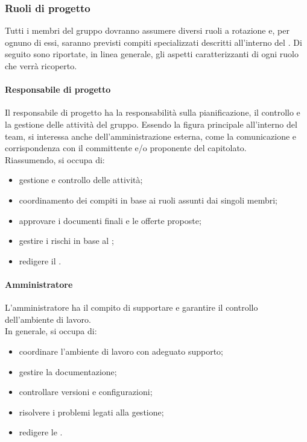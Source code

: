 	\subsubsection{Ruoli di progetto}
	Tutti i membri del gruppo dovranno assumere diversi ruoli a rotazione e, per ognuno di essi, saranno previsti compiti specializzati descritti all'interno del . Di seguito sono riportate, in linea generale, gli aspetti caratterizzanti di ogni ruolo che verrà ricoperto.
	
		\paragraph{Responsabile di progetto}
		Il responsabile di progetto ha la responsabilità sulla pianificazione, il controllo e la gestione delle attività del gruppo. Essendo la figura principale all'interno del team, si interessa anche dell'amministrazione esterna, come la comunicazione e corrispondenza con il committente e/o proponente del capitolato.\\
		Riassumendo, si occupa di:
		\begin{itemize}
			\item gestione e controllo delle attività;
			\item coordinamento dei compiti in base ai ruoli assunti dai singoli membri;
			\item approvare i documenti finali e le offerte proposte;
			\item gestire i rischi in base al ;
			\item redigere il .
		\end{itemize}
		
		\paragraph{Amministratore}
		L'amministratore ha il compito di supportare e garantire il controllo dell'ambiente di lavoro. \\
		In generale, si occupa di:	
		\begin{itemize}
			\item coordinare l'ambiente di lavoro con adeguato supporto;
			\item gestire la documentazione;
			\item controllare versioni e configurazioni;
			\item risolvere i problemi legati alla gestione;
			\item redigere le .
		\end{itemize}
	
